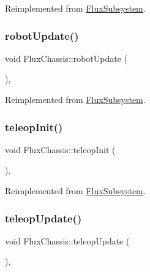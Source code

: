 Reimplemented from \hyperlink{classFluxSubsystem_aacd5ddfcadda0866d5e838de09a60d63}{Flux\+Subsystem}.

\mbox{\label{classFluxChassis_ad76138955ede1324ba7d4da824cb39f3}} 
\subsubsection{\texorpdfstring{robot\+Update()}{robotUpdate()}}
{\footnotesize\ttfamily void Flux\+Chassis\+::robot\+Update (\begin{DoxyParamCaption}{ }\end{DoxyParamCaption})\hspace{0.3cm}{\ttfamily [override]}, {\ttfamily [virtual]}}



Reimplemented from \hyperlink{classFluxSubsystem_ac2b1c08b53251870e945edf7080c1549}{Flux\+Subsystem}.

\mbox{\label{classFluxChassis_af0c4310e2c5cf06b68b4ca6a740ca406}} 
\subsubsection{\texorpdfstring{teleop\+Init()}{teleopInit()}}
{\footnotesize\ttfamily void Flux\+Chassis\+::teleop\+Init (\begin{DoxyParamCaption}{ }\end{DoxyParamCaption})\hspace{0.3cm}{\ttfamily [override]}, {\ttfamily [virtual]}}



Reimplemented from \hyperlink{classFluxSubsystem_aec6d05e4f80c3783684598fb92ad2e55}{Flux\+Subsystem}.

\mbox{\label{classFluxChassis_af7ec99f668e784fec47bb2bea24fff63}} 
\subsubsection{\texorpdfstring{teleop\+Update()}{teleopUpdate()}}
{\footnotesize\ttfamily void Flux\+Chassis\+::teleop\+Update (\begin{DoxyParamCaption}{ }\end{DoxyParamCaption})\hspace{0.3cm}{\ttfamily [override]}, {\ttfamily [virtual]}}



